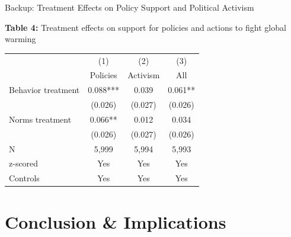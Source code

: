 \documentclass{beamer}
\begin{document}
\begin{frame}{Backup: Treatment Effects on Policy Support and Political Activism}

    \begin{table}[h]
    \centering
    \scriptsize
    \textbf{Table 4: }Treatment effects on support for policies and actions to fight global warming
    \begin{tabular}{lccc}
    \toprule\toprule
                       & (1)       & (2)      & (3)      \\
                       & Policies  & Activism & All      \\
    \midrule
    Behavior treatment & 0.088***  & 0.039    & 0.061**  \\
                       & (0.026)   & (0.027)  & (0.026)  \\
    \addlinespace
    Norms treatment    & 0.066**   & 0.012    & 0.034    \\
                       & (0.026)   & (0.027)  & (0.026)  \\
    \midrule
    N                  & 5,999     & 5,994    & 5,993    \\
    z-scored           & Yes       & Yes      & Yes      \\
    Controls           & Yes       & Yes      & Yes      \\
    \bottomrule\bottomrule
    \end{tabular}
\end{table}
\end{frame}

\section{Conclusion \& Implications}
\end{document}
